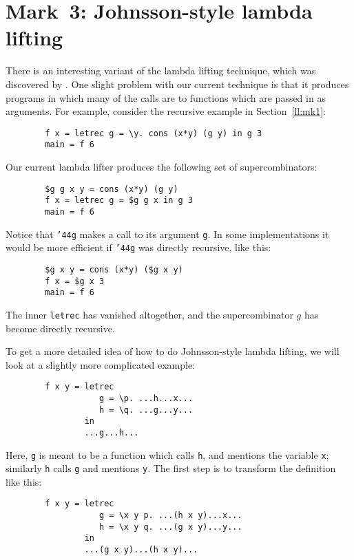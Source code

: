         \section{Mark~3: Johnsson-style lambda lifting}
        \label{ll:jll}\label{sect:johnsson}

There is an interesting variant of the lambda lifting technique, which
was discovered by \cite{JohnssonLL}. One slight problem with our
current technique is that it produces programs in which many of the
calls are to functions which are passed in as arguments.  For example,
consider the recursive example in Section~\ref{ll:mk1}:
\begin{verbatim}
        f x = letrec g = \y. cons (x*y) (g y) in g 3
        main = f 6
\end{verbatim}
Our current lambda lifter produces the following set of
supercombinators:
\begin{verbatim}
        $g g x y = cons (x*y) (g y)
        f x = letrec g = $g g x in g 3
        main = f 6
\end{verbatim}
Notice that \mbox{\tt {\char'44}g} makes a call to its argument \mbox{\tt g}.  In some
implementations it would be more efficient if \mbox{\tt {\char'44}g} was directly
recursive, like this:
\begin{verbatim}
        $g x y = cons (x*y) ($g x y)
        f x = $g x 3
        main = f 6
\end{verbatim}
The inner \mbox{\tt letrec} has vanished altogether, and the supercombinator
$g$ has become directly recursive.

To get a more detailed idea of how to do Johnsson-style lambda
lifting, we will look at a slightly more complicated example:
\begin{verbatim}
        f x y = letrec
                   g = \p. ...h...x...
                   h = \q. ...g...y...
                in
                ...g...h...
\end{verbatim}
Here, \mbox{\tt g} is meant to be a function which calls \mbox{\tt h}, and mentions the
variable \mbox{\tt x}; similarly \mbox{\tt h} calls \mbox{\tt g} and mentions \mbox{\tt y}.  The first
step is to transform the definition like this:
\begin{verbatim}
        f x y = letrec
                   g = \x y p. ...(h x y)...x...
                   h = \x y q. ...(g x y)...y...
                in
                ...(g x y)...(h x y)...
\end{verbatim}

